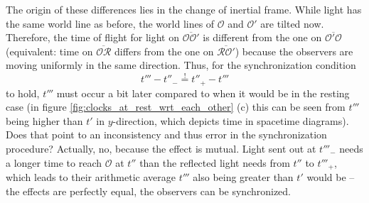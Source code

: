 The origin of these differences lies in the change of inertial frame. While light has the same world line as before, the world lines of $\mathcal{O}$ and $\mathcal{O}'$ are tilted now. Therefore, the time of flight for light on $\overline{\mathcal{O} \mathcal{O}'}$ is different from the one on $\overline{\mathcal{O}' \mathcal{O}}$ (equivalent: time on $\overline{\mathcal{O} \mathcal{R}}$ differs from the one on $\overline{\mathcal{R} \mathcal{O}'}$) because the observers are moving uniformly in the same direction. Thus, for the synchronization condition
\begin{equation}
	t''' - t''_- \overset{!}{=} t''_+ - t'''
\end{equation}
to hold, $t'''$ must occur a bit later compared to when it would be in the resting case (in figure \ref{fig:clocks_at_rest_wrt_each_other} (c) this can be seen from $t'''$ being higher than $t'$ in $y$-direction, which depicts time in spacetime diagrams). Does that point to an inconsistency and thus error in the synchronization procedure? Actually, no, because the effect is mutual. Light sent out at $t'''_-$ needs a longer time to reach $\mathcal{O}$ at $t''$ than the reflected light needs from $t''$ to $t'''_+$, which leads to their arithmetic average $t'''$ also being greater than $t'$ would be -- the effects are perfectly equal, the observers can be synchronized.




